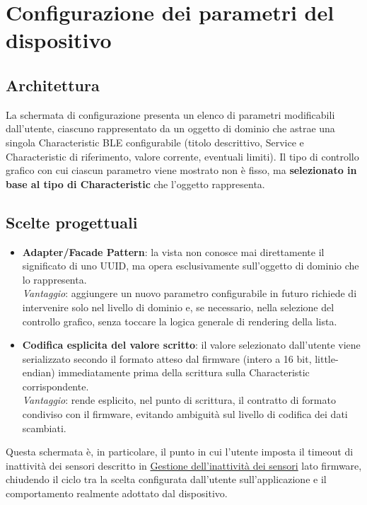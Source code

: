\newpage

\section{Configurazione dei parametri del dispositivo} \label{sec:app-config}

\subsection{Architettura}

La schermata di configurazione presenta un elenco di parametri modificabili dall'utente, ciascuno rappresentato da un oggetto di dominio che
astrae una singola Characteristic BLE configurabile (titolo descrittivo, Service e Characteristic di riferimento, valore corrente, eventuali
limiti). Il tipo di controllo grafico con cui ciascun parametro viene mostrato non è fisso, ma \textbf{selezionato in base al tipo di
Characteristic} che l'oggetto rappresenta.

\subsection{Scelte progettuali}

\begin{itemize}
    \item \textbf{Adapter/Facade Pattern}: la vista non conosce mai direttamente il significato di uno UUID,
    ma opera esclusivamente sull'oggetto di dominio che lo rappresenta.\\
    \textit{Vantaggio}: aggiungere un nuovo parametro configurabile in futuro richiede di intervenire solo nel livello di dominio e,
    se necessario, nella selezione del controllo grafico, senza toccare la logica generale di rendering della lista.
    \item \textbf{Codifica esplicita del valore scritto}: il valore selezionato dall'utente viene serializzato secondo il formato atteso dal
    firmware (intero a 16 bit, little-endian) immediatamente prima della scrittura sulla Characteristic corrispondente.\\
    \textit{Vantaggio}: rende esplicito, nel punto di scrittura, il contratto di formato condiviso con il firmware, evitando ambiguità sul livello
    di codifica dei dati scambiati.
\end{itemize}

Questa schermata è, in particolare, il punto in cui l'utente imposta il timeout di inattività dei sensori descritto in
\hyperref[sec:inattivita]{Gestione dell'inattività dei sensori} lato firmware, chiudendo il ciclo tra la scelta configurata dall'utente
sull'applicazione e il comportamento realmente adottato dal dispositivo.

\newpage

